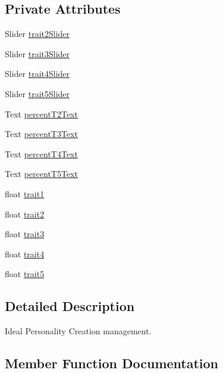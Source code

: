 \subsection*{Private Attributes}
\begin{DoxyCompactItemize}
\item 
Slider \mbox{\hyperlink{class_personality_creation_a66385732bf27dc80b0eb6cd4f3b772d2}{trait2\+Slider}}
\item 
Slider \mbox{\hyperlink{class_personality_creation_a0a447917a912ebfc05710ab066670de3}{trait3\+Slider}}
\item 
Slider \mbox{\hyperlink{class_personality_creation_a263a2a66b417754deb2aa63f1e0b73b1}{trait4\+Slider}}
\item 
Slider \mbox{\hyperlink{class_personality_creation_a21048043717bf28208f3dd28180d2521}{trait5\+Slider}}
\item 
Text \mbox{\hyperlink{class_personality_creation_ab602b8a8beefd098fefa2d6182194da7}{percent\+T2\+Text}}
\item 
Text \mbox{\hyperlink{class_personality_creation_a66e92793d59bdd9375183bb0507b1ffa}{percent\+T3\+Text}}
\item 
Text \mbox{\hyperlink{class_personality_creation_ac4e1810fe90838e0c7da67a793e2ee67}{percent\+T4\+Text}}
\item 
Text \mbox{\hyperlink{class_personality_creation_a569dddd291ecb6ad0df7ce8ad58280a4}{percent\+T5\+Text}}
\item 
float \mbox{\hyperlink{class_personality_creation_ac1035e316841bd1f8c3efb39fe8fa169}{trait1}}
\item 
float \mbox{\hyperlink{class_personality_creation_a578fba175bbebcadf5ac80e425d5a5a6}{trait2}}
\item 
float \mbox{\hyperlink{class_personality_creation_a6016c2ed1dbdbfb65209899ea630def7}{trait3}}
\item 
float \mbox{\hyperlink{class_personality_creation_ad2dad285fa04cae8b305a0258625f6fe}{trait4}}
\item 
float \mbox{\hyperlink{class_personality_creation_a30b74c5f0348b95255194ba01d22747e}{trait5}}
\end{DoxyCompactItemize}


\subsection{Detailed Description}
Ideal Personality Creation management. 

\subsection{Member Function Documentation}
\mbox{\label{class_personality_creation_a60f9fca99fc7cf87fe6db7778684776e}} 
